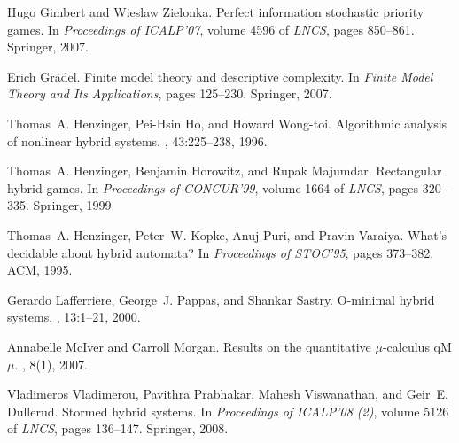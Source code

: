 \documentclass[fleqn,envcountsame]{LMCS}
\begin{document}
\begin{thebibliography}{10}
Hugo Gimbert and Wieslaw Zielonka.
\newblock Perfect information stochastic priority games.
\newblock In {\em Proceedings of ICALP'07}, volume 4596 of {\em LNCS}, pages
  850--861. Springer, 2007.

Erich Gr{\"a}del.
\newblock Finite model theory and descriptive complexity.
\newblock In {\em Finite Model Theory and Its Applications}, pages 125--230.
  Springer, 2007.

Thomas~A. Henzinger, Pei-Hsin Ho, and Howard Wong-toi.
\newblock Algorithmic analysis of nonlinear hybrid systems.
, 43:225--238, 1996.

Thomas~A. Henzinger, Benjamin Horowitz, and Rupak Majumdar.
\newblock Rectangular hybrid games.
\newblock In {\em Proceedings of CONCUR'99}, volume 1664 of {\em LNCS}, pages
  320--335. Springer, 1999.

Thomas~A. Henzinger, Peter~W. Kopke, Anuj Puri, and Pravin Varaiya.
\newblock What's decidable about hybrid automata?
\newblock In {\em Proceedings of STOC'95}, pages 373--382. ACM, 1995.

Gerardo Lafferriere, George~J. Pappas, and Shankar Sastry.
\newblock O-minimal hybrid systems.
, 13:1--21, 2000.

Annabelle McIver and Carroll Morgan.
\newblock Results on the quantitative $\mu$-calculus q{M}{$\mu$}.
, 8(1), 2007.

Vladimeros Vladimerou, Pavithra Prabhakar, Mahesh Viswanathan, and Geir~E.
  Dullerud.
\newblock Stormed hybrid systems.
\newblock In {\em Proceedings of ICALP'08 (2)}, volume 5126 of {\em LNCS},
  pages 136--147. Springer, 2008.

\end{thebibliography}
\end{document}
